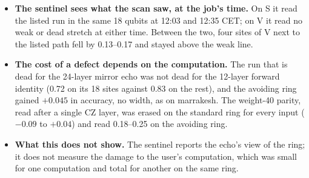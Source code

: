 \documentclass[11pt]{article}
\begin{document}
\begin{table}[h]
\centering\small
{}
\caption{The sentinel and two computations on the same rings. The kicked-Ising evolution on the healthy $n=20$ ring
recovered 0.91 ($L=4$) and 0.84 ($L=8$) of the exact answer; its error was 1\,\% and 4\,\% of a fully mixed output's.}
\label{tab:sentinel}
\end{table}

\begin{itemize}
\item \textbf{The sentinel sees what the scan saw, at the job's time.} On S it read the listed run in the same 18
  qubits at 12:03 and 12:35 CET; on V it read no weak or dead stretch at either time. Between the two, four sites of V
  next to the listed path fell by 0.13--0.17 and stayed above the weak line.
\item \textbf{The cost of a defect depends on the computation.} The run that is dead for the 24-layer mirror echo was
  not dead for the 12-layer forward identity (0.72 on its 18 sites against 0.83 on the rest), and the avoiding ring
  gained $+0.045$ in accuracy, no width, as on marrakesh. The weight-40 parity, read after a single CZ layer, was
  erased on the standard ring for every input ($-0.09$ to $+0.04$) and read 0.18--0.25 on the avoiding ring.
\item \textbf{What this does not show.} The sentinel reports the echo's view of the ring; it does not measure the
  damage to the user's computation, which was small for one computation and total for another on the same ring.
\end{itemize}
\end{document}

